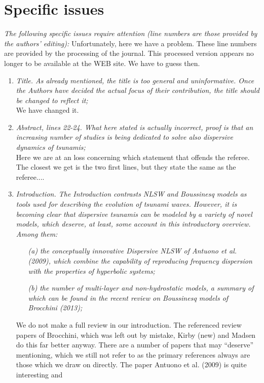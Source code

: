 \documentclass[11pt]{article}
\begin{document}
\section*{Specific issues}
{\em The following specific issues require attention (line numbers are those provided by the
authors’ editing):}
Unfortunately, here we have a problem. These line numbers are provided by the processing of the journal.
This processed version appears  no longer to be available at the WEB site. We have to guess then. 
\begin{enumerate}
\item{\em Title. As already mentioned, the title is too general and uninformative. Once the
Authors have decided the actual focus of their contribution, the title should be
changed to reflect it;}\\
We have changed it. 
\item{\em Abstract, lines 22-24. What here stated is actually incorrect, proof is that an
increasing number of studies is being dedicated to solve also dispersive dynamics of
tsunamis;}\\
Here we are at an loss concerning which statement that offends the referee. The closest we 
get is the two first lines, but they state the same as the referee....
\item {\em Introduction. The Introduction contrasts NLSW and Boussinesq models as tools
used for describing the evolution of tsunami waves. However, it is becoming clear
that dispersive tsunamis can be modeled by a variety of novel models, which deserve,
at least, some account in this introductory overview.\\
Among them:}
\begin{itemize}
\item[{\em (a)}] {\em the conceptually innovative Dispersive NLSW of Antuono et al. (2009), which
combine the capability of reproducing frequency dispersion with the properties
of hyperbolic systems;}
\item[{\em (b)}] {\em the number of multi-layer and non-hydrostatic models, a summary of which
can be found in the recent review on Boussinesq models of Brocchini (2013);}
\end{itemize}
We do not make a full review in our introduction. The referenced review papers of Brocchini, which was left out 
by mistake, Kirby (new) and Madsen do this far better anyway.
There are a number of papers that may ``deserve'' mentioning, which we  still not refer to  as the primary references
always are those which we draw on directly.  The paper Antuono et al. (2009) is quite interesting and

\end{enumerate}
\end{document}
